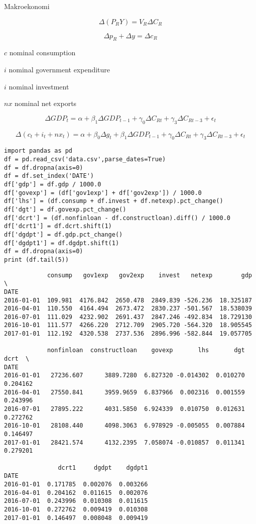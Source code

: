 \documentclass[12pt,fleqn]{article}\usepackage{../../common}
\begin{document}
Makroekonomi

$$ \Delta (P_RY) = V_R\Delta C_R$$

$$ \Delta p_R + \Delta y = \Delta c_R$$




$c$ nominal consumption 

$i$ nominal government expenditure

$i$ nominal investment 

$nx$ nominal net exports

$$ \Delta GDP_t = 
\alpha + \beta_1 \Delta GDP_{t-1} + 
\gamma_0 \Delta C_{Rt} + \gamma_3 \Delta C_{Rt-3} + \epsilon_t 
$$

$$ 
\Delta (c_t + i_t + nx_t) = 
\alpha + \beta_0 \Delta g_t + \beta_1 \Delta GDP_{t-1} + 
\gamma_0 \Delta C_{Rt} + \gamma_3 \Delta C_{Rt-3} + \epsilon_t 
$$


\begin{verbatim}
import pandas as pd
df = pd.read_csv('data.csv',parse_dates=True)
df = df.dropna(axis=0)
df = df.set_index('DATE')
df['gdp'] = df.gdp / 1000.0
df['govexp'] = (df['gov1exp'] + df['gov2exp']) / 1000.0
df['lhs'] = (df.consump + df.invest + df.netexp).pct_change() 
df['dgt'] = df.govexp.pct_change() 
df['dcrt'] = (df.nonfinloan - df.constructloan).diff() / 1000.0
df['dcrt1'] = df.dcrt.shift(1)
df['dgdpt'] = df.gdp.pct_change()
df['dgdpt1'] = df.dgdpt.shift(1)
df = df.dropna(axis=0)
print (df.tail(5))
\end{verbatim}

\begin{verbatim}
            consump   gov1exp   gov2exp    invest   netexp        gdp  \
DATE                                                                    
2016-01-01  109.981  4176.842  2650.478  2849.839 -526.236  18.325187   
2016-04-01  110.550  4164.494  2673.472  2830.237 -501.567  18.538039   
2016-07-01  111.029  4232.902  2691.437  2847.246 -492.834  18.729130   
2016-10-01  111.577  4266.220  2712.709  2905.720 -564.320  18.905545   
2017-01-01  112.192  4320.538  2737.536  2896.996 -582.844  19.057705   

            nonfinloan  constructloan    govexp       lhs       dgt      dcrt  \
DATE                                                                            
2016-01-01   27236.607      3889.7280  6.827320 -0.014302  0.010270  0.204162   
2016-04-01   27550.841      3959.9659  6.837966  0.002316  0.001559  0.243996   
2016-07-01   27895.222      4031.5850  6.924339  0.010750  0.012631  0.272762   
2016-10-01   28108.440      4098.3063  6.978929 -0.005055  0.007884  0.146497   
2017-01-01   28421.574      4132.2395  7.058074 -0.010857  0.011341  0.279201   

               dcrt1     dgdpt    dgdpt1  
DATE                                      
2016-01-01  0.171785  0.002076  0.003266  
2016-04-01  0.204162  0.011615  0.002076  
2016-07-01  0.243996  0.010308  0.011615  
2016-10-01  0.272762  0.009419  0.010308  
2017-01-01  0.146497  0.008048  0.009419  
\end{verbatim}
\end{document}

